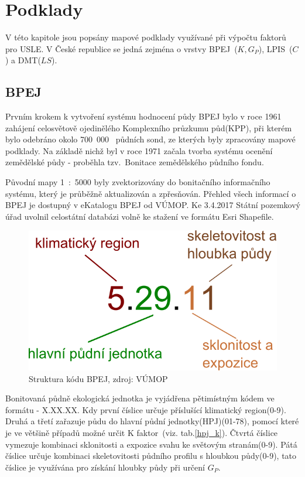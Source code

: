 \chapter{Podklady}
V této kapitole jsou popsány mapové podklady využívané při výpočtu 
faktorů pro USLE. V České republice se jedná zejména o vrstvy 
BPEJ~($K, G_P$), LPIS~($C$) a DMT($LS$).
\section{BPEJ}
Prvním krokem k vytvoření systému hodnocení půdy BPEJ bylo v roce 1961
zahájení celosvětově ojedinělého Komplexního průzkumu půd(KPP), při
kterém bylo odebráno okolo 700~000~ půdních sond, ze kterých byly
zpracovány mapové podklady. Na základě nichž byl v roce 1971 začala
tvorba systému ocenění zemědělské půdy - proběhla tzv.~Bonitace
zemědělského půdního fondu.

Původní mapy 1~:~5000 byly zvektorizovány do bonitačního informačního
systému, který je průběžně aktualizován a zpřesňován. Přehled všech
informací o BPEJ je dostupný v eKatalogu BPEJ od
VÚMOP\cite{bpej_vumop}. Ke 3.4.2017 Státní pozemkový úřad uvolnil
celostátní databázi volně ke stažení ve formátu Esri Shapefile\cite{spucr}.
\begin{figure}[H]
    \centering
    \includegraphics[scale=0.5]{./pictures/Struktura_BPEJ.png}
      \caption[Struktura kódu BPEJ]{Struktura kódu BPEJ, zdroj:
        VÚMOP\cite{bpej_vumop}}
      \label{fig:struktura_bpej}
\end{figure}
Bonitovaná půdně ekologická jednotka je vyjádřena pětimístným kódem ve
formátu - X.XX.XX. Kdy první číslice určuje příslušící klimatický
region(0-9). Druhá a třetí zařazuje půdu do hlavní půdní
jednotky(HPJ)(01-78), pomocí které je ve většině případů možné určit K
faktor~(viz. tab.\ref{hpj_k}). Čtvrtá číslice vymezuje kombinaci
sklonitosti a expozice svahu ke světovým stranám(0-9). Pátá číslice
určuje kombinaci skeletovitosti půdního profilu s hloubkou půdy(0-9),
tato číslice je využívána pro získání hloubky půdy při určení
$G_P$.\cite{Novotny2013}
